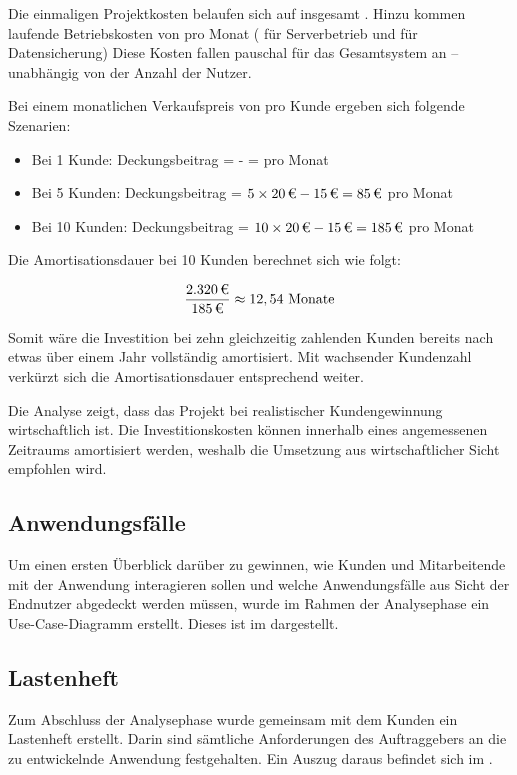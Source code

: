 		Die einmaligen Projektkosten belaufen sich auf insgesamt .
		Hinzu kommen laufende Betriebskosten von  pro Monat ( für Serverbetrieb und  für Datensicherung)
		Diese Kosten fallen pauschal für das Gesamtsystem an – unabhängig von der Anzahl der Nutzer.

		Bei einem monatlichen Verkaufspreis von  pro Kunde ergeben sich folgende Szenarien:

		\begin{itemize}
		\item Bei 1 Kunde: Deckungsbeitrag =  -  =  pro Monat
		\item Bei 5 Kunden: Deckungsbeitrag = $5 \times \eur{20} - \eur{15} = \eur{85}$ pro Monat
		\item Bei 10 Kunden: Deckungsbeitrag = $10 \times \eur{20} - \eur{15} = \eur{185}$ pro Monat
		\end{itemize}

		Die Amortisationsdauer bei 10 Kunden berechnet sich wie folgt:

		\begin{eqnarray}
		\frac{\eur{2.320}}{\eur{185}} \approx 12,54 \ \mbox{Monate}
		\end{eqnarray}

		Somit wäre die Investition bei zehn gleichzeitig zahlenden Kunden bereits nach etwas über einem Jahr vollständig amortisiert.
		Mit wachsender Kundenzahl verkürzt sich die Amortisationsdauer entsprechend weiter.

		Die Analyse zeigt, dass das Projekt bei realistischer Kundengewinnung wirtschaftlich ist.
		Die Investitionskosten können innerhalb eines angemessenen Zeitraums amortisiert werden,
		weshalb die Umsetzung aus wirtschaftlicher Sicht empfohlen wird.


\subsection{Anwendungsfälle}
\label{sec:Anwendungsfaelle}
	Um einen ersten Überblick darüber zu gewinnen, wie Kunden und Mitarbeitende mit der Anwendung interagieren sollen
	und welche Anwendungsfälle aus Sicht der Endnutzer abgedeckt werden müssen, wurde im Rahmen der Analysephase ein Use-Case-Diagramm erstellt.
	Dieses ist im  dargestellt.


\subsection{Lastenheft}
\label{sec:Lastenheft}
	Zum Abschluss der Analysephase wurde gemeinsam mit dem Kunden ein Lastenheft erstellt.
	Darin sind sämtliche Anforderungen des Auftraggebers an die zu entwickelnde Anwendung festgehalten.
	Ein Auszug daraus befindet sich im .
